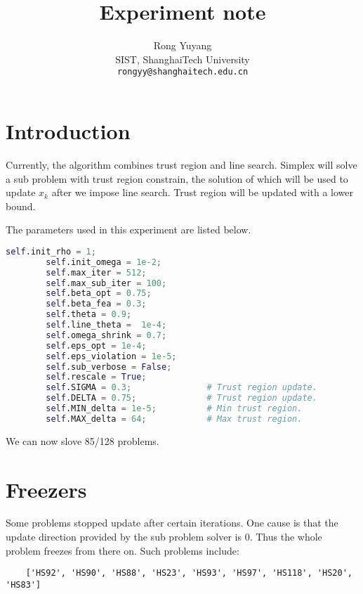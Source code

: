 \documentclass[10pt]{article}
\begin{document}
\title{
	Experiment note
}
\author{Rong Yuyang \\
SIST, ShanghaiTech University\\
{\tt\small rongyy@shanghaitech.edu.cn}
}
\maketitle

\section{Introduction}\par
Currently, the algorithm combines trust region and line search. Simplex will solve a sub problem with trust region constrain, the solution of which will be used to update $x_k$ after we impose line search. Trust region will be updated with a lower bound. \par
The parameters used in this experiment are listed below.
	\begin{lstlisting}[language = python]
        self.init_rho = 1;
        self.init_omega = 1e-2;
        self.max_iter = 512;
        self.max_sub_iter = 100;
        self.beta_opt = 0.75;
        self.beta_fea = 0.3;
        self.theta = 0.9;
        self.line_theta =  1e-4;
        self.omega_shrink = 0.7;
        self.eps_opt = 1e-4;
        self.eps_violation = 1e-5;
        self.sub_verbose = False;
        self.rescale = True;
        self.SIGMA = 0.3;               # Trust region update.
        self.DELTA = 0.75;              # Trust region update.
        self.MIN_delta = 1e-5;          # Min trust region.    
        self.MAX_delta = 64;            # Max trust region.
	\end{lstlisting}
We can now slove 85/128 problems.
\section{Freezers}\par
	Some problems stopped update after certain iterations. One cause is that the update direction provided by the sub problem solver is $0$. Thus the whole problem freezes from there on. Such problems include:
	\begin{lstlisting}
	['HS92', 'HS90', 'HS88', 'HS23', 'HS93', 'HS97', 'HS118', 'HS20', 'HS83']
	\end{lstlisting}
\end{document}
